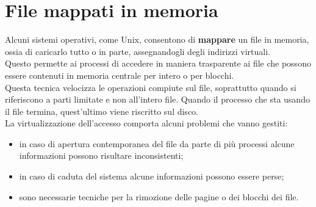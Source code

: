\documentclass[12pt, letterpaper]{report}
\begin{document}
	\section{File mappati in memoria}
	Alcuni sistemi operativi, come Unix, consentono di \textbf{mappare} un file in memoria, ossia di caricarlo tutto o in parte, assegnandogli degli indirizzi virtuali. \\
	Questo permette ai processi di accedere in maniera trasparente ai file che possono essere contenuti in memoria centrale per intero o per blocchi. \\
	Questa tecnica velocizza le operazioni compiute sul file, soprattutto quando si riferiscono a parti limitate e non all'intero file. Quando il processo che sta usando il file termina, quest'ultimo viene riscritto sul disco. \\
	La virtualizzazione dell'accesso comporta alcuni problemi che vanno gestiti:
	\begin{itemize}
		\item in caso di apertura contemporanea del file da parte di più processi alcune informazioni possono risultare inconsistenti;
		\item in caso di caduta del sistema alcune informazioni possono essere perse;
		\item sono necessarie tecniche per la rimozione delle pagine o dei blocchi dei file.
	\end{itemize}
\end{document}
